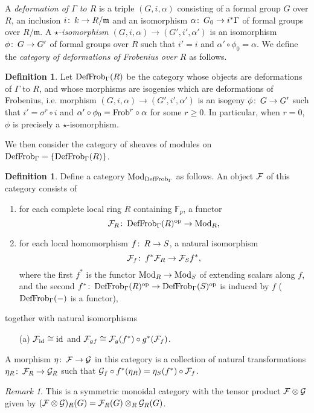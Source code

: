 \documentclass{gtpart}
\theoremstyle{definition}
\newtheorem{defn}[thm]{Definition}
\theoremstyle{remark}
\newtheorem{rmk}[thm]{Remark}
\def\co{\colon\thinspace}
\newcommand{\mb}[1]{\mathbb{#1}}
\newcommand{\mf}[1]{\mathfrak{#1}}
\newcommand{\Mod}{{\rm Mod}}
\newcommand{\Frob}{{\rm Frob}}
\newcommand{\DF}{{{\rm DefFrob}_\Gamma}}
\begin{document}
A {\em deformation of $\Gamma$ to $R$} is a triple $(G,i,\alpha)$ 
consisting of a formal group $G$ over $R$, an inclusion 
$i\co k \to R/\mf m$ and an isomorphism $\alpha\co G_0 \to i^*\Gamma$ of 
formal groups over $R/\mf m$.  A {\em $\star$-isomorphism 
$(G,i,\alpha) \to (G',i',\alpha')$} is an isomorphism $\phi\co G \to G'$ 
of formal groups over $R$ such that $i' = i$ and 
$\alpha' \circ \phi_0 = \alpha$.  We define the {\em category of 
deformations of Frobenius over $R$} as follows.  
\begin{defn}
 Let $\DF(R)$ be the category whose objects are deformations of $\Gamma$ 
 to $R$, and whose morphisms are isogenies which are deformations of 
 Frobenius, i.e. morphism $(G,i,\alpha) \to (G',i',\alpha')$ 
 is an isogeny $\phi\co G \to G'$ such that $i' = \sigma^r \circ i$ and 
 $\alpha' \circ \phi_0 = \Frob^r \circ \alpha$ for some $r \geq 0$.  In 
 particular, when $r = 0$, $\phi$ is precisely a $\star$-isomorphism.  
\end{defn}

We then consider the category of sheaves of modules on $\DF = \{\DF(R)\}$.  
\begin{defn}
\label{def:mod}
 Define a category $\Mod_\DF$ as follows.  An object $\cal F$ of this 
 category consists of 
 \begin{enumerate}
  \item for each complete local ring $R$ containing ${\mb F}_p$, a 
  functor
  \[
  {\cal F}_R\co \DF(R)^{\rm op} \to \Mod_R,
  \]
  \item for each local homomorphism $f\co R \to S$, a natural 
  isomorphism 
  \[
  {\cal F}_f\co f^*{\cal F}_R \to {\cal F}_{S}f^*,
  \]
  where the first $f^*$ is the functor $\Mod_R \to \Mod_{S}$ of 
  extending scalars along $f$, and the second 
  $f^*\co \DF(R)^{\rm op} \to \DF(S)^{\rm op}$ is induced by $f$ ($\DF(-)$ is a functor),
 \end{enumerate}
 together with natural isomorphisms
 \begin{enumerate}
 \item[(a)] ${\cal F}_{\rm id} \cong {\rm id}$ and 
 ${\cal F}_{gf} \cong {\cal F}_g(f^*) \circ g^*({\cal F}_f)$.  
 \end{enumerate}
 A morphism $\eta\co {\cal F} \to {\cal G}$ in this category is a 
 collection of natural transformations 
 $\eta_R\co {\cal F}_R \to {\cal G}_R$ such that 
 ${\cal G}_f \circ f^*(\eta_R) = \eta_{S}(f^*) \circ {\cal F}_f$.  
\end{defn}
\begin{rmk}
 This is a symmetric monoidal category with the tensor product 
 ${\cal F} \otimes {\cal G}$ given by $({\cal F} \otimes {\cal G})_R(G) 
 = {\cal F}_R(G) \otimes_R {\cal G}_R(G)$.  
\end{rmk}
\end{document}
